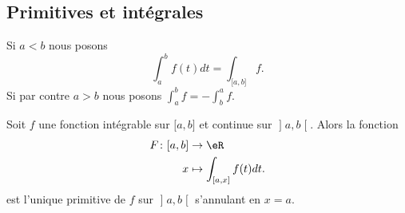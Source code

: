 \subsection{Primitives et intégrales}

\begin{definition}      \label{DEFooGLJDooFeZBBC}
	Si \( a<b\) nous posons
	\begin{equation}
		\int_a^bf(t)dt=\int_{\mathopen[ a , b \mathclose]}f.
	\end{equation}
	Si par contre \( a>b\) nous posons \( \int_a^bf=-\int_b^af\).
\end{definition}

\begin{proposition} \label{PropEZFRsMj}
	Soit \( f\) une fonction intégrable sur \( \mathopen[ a , b \mathclose]\) et continue sur \( \mathopen] a , b \mathclose[\). Alors la fonction
		\begin{equation}
			\begin{aligned}
				F\colon \mathopen[ a , b \mathclose] & \to \eR                                            \\
				x                                    & \mapsto \int_{\mathopen[ a , x \mathclose]}f(t)dt.
			\end{aligned}
		\end{equation}
		est l'unique primitive de \( f\) sur \( \mathopen] a , b \mathclose[\) s'annulant en \( x=a\).
\end{proposition}

